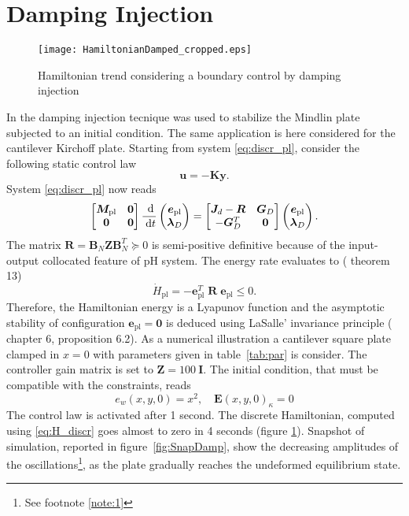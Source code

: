 \documentclass[letterpaper, 10 pt, conference]{ieeeconf}
\begin{document}
\section{Damping Injection}
\begin{figure}[tb]
	\centering
	\texttt{[image: HamiltonianDamped\_cropped.eps]}
	\caption{Hamiltonian trend considering a boundary control by damping injection}
	\label{fig:H_Damped}
\end{figure}
\label{sec:Damp}
In \cite{MacchelliMindlin} the damping injection tecnique was used to stabilize the Mindlin plate subjected to an initial condition. The same application is here considered for the cantilever Kirchoff plate. Starting from system \eqref{eq:discr_pl}, consider the following static control law
\begin{equation}
\bm{u} = -\bm{K} \bm{y}.
\end{equation}
System \eqref{eq:discr_pl} now reads
\begin{equation}
\begin{bmatrix}
\bm{M}_{\text{pl}} & \bm{0} \\
\bm{0} & \bm{0} \\
\end{bmatrix}\frac{\d}{\d t}
\begin{pmatrix}
\bm{e}_{\text{pl}}\\
\bm{\lambda}_D \\
\end{pmatrix}
= \begin{bmatrix}
\bm{J}_d - \bm{R} & \bm{G}_D \\
-\bm{G}_D^T & \bm{0} \\
\end{bmatrix}
\begin{pmatrix}
\bm{e}_{\text{pl}}\\
\bm{\lambda}_D \\
\end{pmatrix}.
\end{equation}
The matrix $\bm{R} = \bm{B}_N \bm{Z} \bm{B}_N^T \succcurlyeq 0$ is semi-positive definitive because of the input-output collocated feature of pH system. The energy rate evaluates to (\cite{beattie2018linear} theorem 13)
\[\dot{H} _{\text{pl}} = - \bm{e}_{\text{pl}}^T \; \bm{R} \; \bm{e}_{\text{pl}} \le 0. \]
Therefore, the Hamiltonian energy is a Lyapunov function and the asymptotic stability of configuration $\bm{e}_{\text{pl}} = \bm{0}$ is deduced using LaSalle' invariance  principle (\cite{bookPHs}  chapter 6, proposition 6.2). As a numerical illustration a cantilever square plate clamped in $x=0$ with parameters given in table~\ref{tab:par} is consider. The controller gain matrix is set to $\bm{Z} = 100 \ \bm{I}$. The initial condition, that must be compatible with the constraints, reads
\[e_w(x,y,0) = x^2, \quad \bm{E}(x,y,0)_{\kappa}=0\]
The control law is activated after 1 second. The discrete Hamiltonian, computed using \eqref{eq:H_discr} goes almost to zero in 4 seconds (figure \ref{fig:H_Damped}). Snapshot of simulation, reported in figure~\ref{fig:SnapDamp}, show the decreasing amplitudes of the oscillations\footnote{See footnote \ref{note:1}}, as the plate gradually reaches the undeformed equilibrium state.
\end{document}
